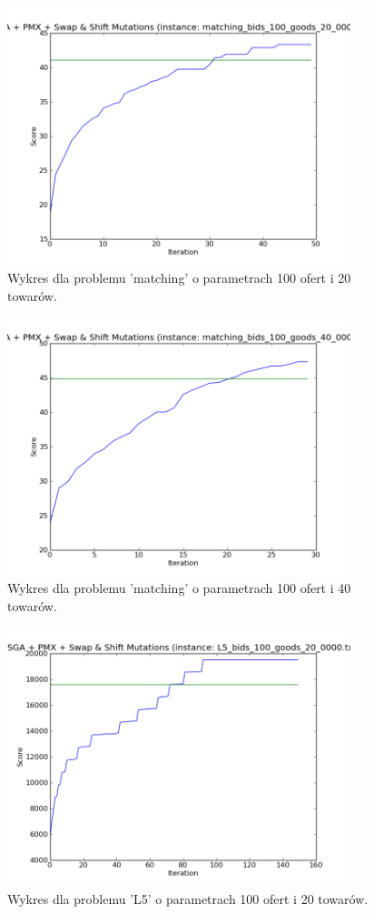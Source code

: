 \begin{figure}[ht!]
    \centering
    \includegraphics[width=10cm]{wykresy/matching_bids_100_goods_20_0000_txt_1.png}
    \caption{Wykres dla problemu 'matching' o parametrach 100 ofert i 20 towarów.}
    \label{wyk:sga1}
\end{figure}

\begin{figure}[ht!]
    \centering
    \includegraphics[width=10cm]{wykresy/matching_bids_100_goods_40_0000_txt_3.png}
    \caption{Wykres dla problemu 'matching' o parametrach 100 ofert i 40 towarów.}
    \label{wyk:sga2}
\end{figure}

\begin{figure}[ht!]
    \centering
    \includegraphics[width=10cm]{wykresy/L5_bids_100_goods_20_0000_txt_1.png}
    \caption{Wykres dla problemu 'L5' o parametrach 100 ofert i 20 towarów.}
    \label{wyk:sga3}
\end{figure}

